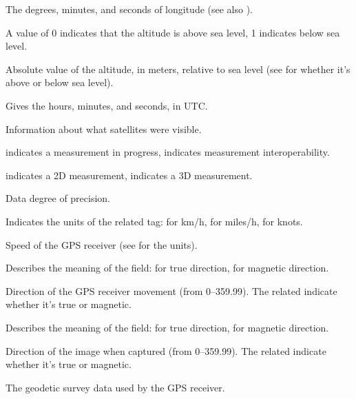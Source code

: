 The degrees, minutes, and seconds of longitude (see also 
).
\apiend

A value of 0 indicates that the altitude is above sea level, 1 indicates
below sea level.
\apiend

Absolute value of the altitude, in meters, relative to sea level 
(see  for whether it's above or below sea level).
\apiend

Gives the hours, minutes, and seconds, in UTC.
\apiend

Information about what satellites were visible.
\apiend

 indicates a measurement in progress,  indicates
measurement interoperability.
\apiend

 indicates a 2D measurement,  indicates a 3D measurement.
\apiend

Data degree of precision.
\apiend

Indicates the units of the related  tag: 
 for km/h,  for miles/h,  for knots.
\apiend

Speed of the GPS receiver (see  for the units).
\apiend

Describes the meaning of the  field:  for true
direction,  for magnetic direction.
\apiend

Direction of the GPS receiver movement (from 0--359.99).  The
related  indicate whether it's true or magnetic.
\apiend

Describes the meaning of the  field:  for true
direction,  for magnetic direction.
\apiend

Direction of the image when captured (from 0--359.99).  The
related  indicate whether it's true or magnetic.

\apiend

The geodetic survey data used by the GPS receiver.
\apiend

